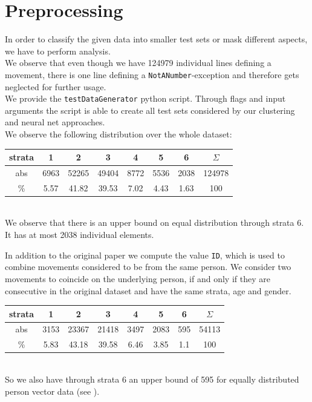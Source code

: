 \documentclass[runningheads]{llncs}
\begin{document}
	\section{Preprocessing}\label{sec: proprocessing}
	In order to classify the given data into smaller test sets or mask different aspects, we have to perform analysis.\\
	We observe that even though we have 124979 individual lines defining a movement, there is one line defining a \texttt{NotANumber}-exception and therefore gets neglected for further usage.	\\
	We provide the \texttt{testDataGenerator} python script. Through flags and input arguments the script is able to create all test sets considered by our clustering and neural net approaches.\\
	We observe the following distribution over the whole dataset:\\
	{\hspace*{2cm}\setlength\tabcolsep{.2cm}\begin{tabular}{c|ccccccc}
		strata &  1   &   2   &   3   &  4   &  5   &  6   & $\Sigma$ \\ \hline
		 abs   & 6963 & 52265 & 49404 & 8772 & 5536 & 2038 &  124978  \\
		  \%   & 5.57 & 41.82 & 39.53 & 7.02 & 4.43 & 1.63 &   100
	\end{tabular}}\\
	We observe that there is an upper bound on equal distribution through strata 6. It has at most 2038 individual elements.
	
	In addition to the original paper we compute the value \texttt{ID}, which is used to combine movements considered to be from the same person.
	We consider two movements to coincide on the underlying person, if and only if they are consecutive in the original dataset and have the same strata, age and gender.
	{\hspace*{2cm}\setlength\tabcolsep{.2cm}\begin{tabular}{c|ccccccc}
		strata &  1   &   2   &   3   &  4   &  5   &  6  & $\Sigma$ \\ \hline
		 abs   & 3153 & 23367 & 21418 & 3497 & 2083 & 595 &  54113   \\
		  \%   & 5.83 & 43.18 & 39.58 & 6.46 & 3.85 & 1.1 &   100
	\end{tabular}}\\
	So we also have through strata 6 an upper bound of 595 for equally distributed person vector data (see ).
	
\end{document}
